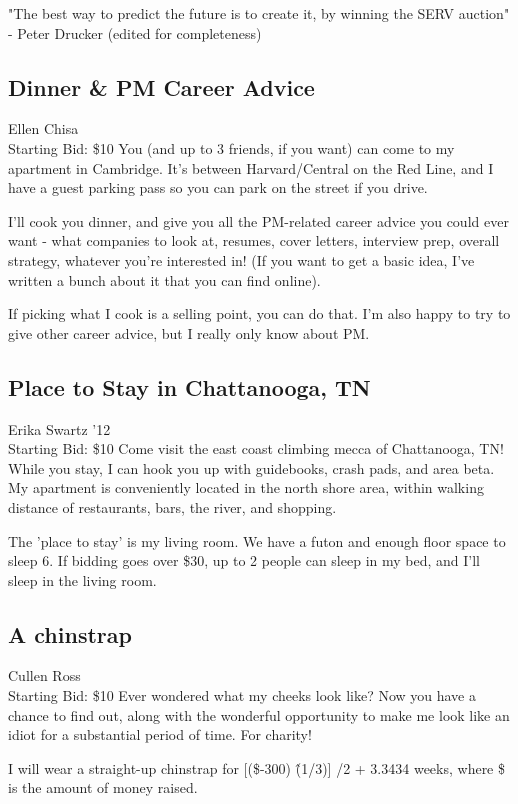 \documentclass[11pt]{article}
\begin{document}
"The best way to predict the future is to create it, by winning the SERV auction" - Peter Drucker (edited for completeness)
\subsection{Dinner \& PM Career Advice}
Ellen Chisa
\\
Starting Bid: \$10
\newline
You (and up to 3 friends, if you want) can come to my apartment in Cambridge. It's between Harvard/Central on the Red Line, and I have a guest parking pass so you can park on the street if you drive.

I'll cook you dinner, and give you all the PM-related career advice you could ever want - what companies to look at, resumes, cover letters, interview prep, overall strategy, whatever you're interested in! (If you want to get a basic idea, I've written a bunch about it that you can find online).

If picking what I cook is a selling point, you can do that. I'm also happy to try to give other career advice, but I really only know about PM.
\subsection{Place to Stay in Chattanooga, TN}
Erika Swartz '12
\\
Starting Bid: \$10
\newline
Come visit the east coast climbing mecca of Chattanooga, TN! While you stay, I can hook you up with guidebooks, crash pads, and area beta. My apartment is conveniently located in the north shore area, within walking distance of restaurants, bars, the river, and shopping. 


The 'place to stay' is my living room. We have a futon and enough floor space to sleep 6. If bidding goes over \$30, up to 2 people can sleep in my bed, and I'll sleep in the living room.
\subsection{A chinstrap}
Cullen Ross
\\
Starting Bid: \$10
\newline
Ever wondered what my cheeks look like? Now you have a chance to find out, along with the wonderful opportunity to make me look like an idiot for a substantial period of time. For charity!

I will wear a straight-up chinstrap for [(\$-300) \^ (1/3)] /2 + 3.3434 weeks, where \$ is the amount of money raised.
\end{document}
